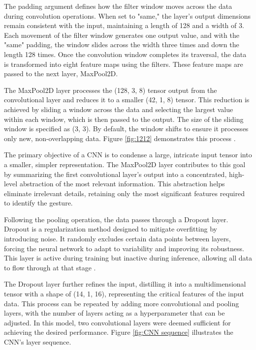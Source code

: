 The padding argument defines how the filter window moves across the data during convolution operations. When set to "same," the layer's output dimensions remain consistent with the input, maintaining a length of 128 and a width of 3. Each movement of the filter window generates one output value, and with the "same" padding, the window slides across the width three times and down the length 128 times. Once the convolution window completes its traversal, the data is transformed into eight feature maps using the filters. These feature maps are passed to the next layer, MaxPool2D.

The MaxPool2D layer processes the (128, 3, 8) tensor output from the convolutional layer and reduces it to a smaller (42, 1, 8) tensor. This reduction is achieved by sliding a window across the data and selecting the largest value within each window, which is then passed to the output. The size of the sliding window is specified as (3, 3). By default, the window shifts to ensure it processes only new, non-overlapping data. Figure \ref{fig:1212} demonstrates this process \cite{Warden:2020}.

The primary objective of a CNN is to condense a large, intricate input tensor into a smaller, simpler representation. The MaxPool2D layer contributes to this goal by summarizing the first convolutional layer's output into a concentrated, high-level abstraction of the most relevant information. This abstraction helps eliminate irrelevant details, retaining only the most significant features required to identify the gesture.

Following the pooling operation, the data passes through a Dropout layer. Dropout is a regularization method designed to mitigate overfitting by introducing noise. It randomly excludes certain data points between layers, forcing the neural network to adapt to variability and improving its robustness. This layer is active during training but inactive during inference, allowing all data to flow through at that stage \cite{Warden:2020}.

The Dropout layer further refines the input, distilling it into a multidimensional tensor with a shape of (14, 1, 16), representing the critical features of the input data. This process can be repeated by adding more convolutional and pooling layers, with the number of layers acting as a hyperparameter that can be adjusted. In this model, two convolutional layers were deemed sufficient for achieving the desired performance. Figure \ref{fig:CNN sequence} illustrates the CNN's layer sequence.

